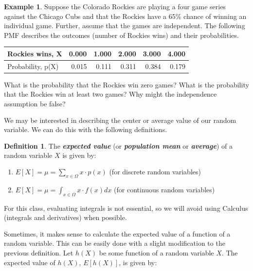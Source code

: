 \documentclass[
  11pt,
]{book}
\theoremstyle{definition}
\newtheorem{definition}{Definition}[chapter]
\theoremstyle{definition}
\newtheorem{example}{Example}[chapter]
\theoremstyle{definition}
\theoremstyle{definition}
\theoremstyle{remark}
\begin{document}
\begin{example}
Suppose the Colorado Rockies are playing a four game series against the Chicago Cubs and that the Rockies have a 65\% chance of winning an individual game. Further, assume that the games are independent. The following PMF describes the outcomes (number of Rockies wins) and their probabilities.

\begin{table}
\centering
\begin{tabular}{l|r|r|r|r|r}
\hline
Rockies wins, X & 0.000 & 1.000 & 2.000 & 3.000 & 4.000\\
\hline
Probability, p(X) & 0.015 & 0.111 & 0.311 & 0.384 & 0.179\\
\hline
\end{tabular}
\end{table}

What is the probability that the Rockies win zero games? What is the probability that the Rockies win at least two games? Why might the independence assumption be false?
\end{example}

\hfill\break
\hfill\break
\hfill\break
\hfill\break
\hfill\break

We may be interested in describing the center or average value of our random variable. We can do this with the following definitions.

\begin{definition}

The \textbf{\emph{expected value}} (or \textbf{\emph{population mean}} or \textbf{\emph{average}}) of a random variable \(X\) is given by:\\

\begin{enumerate}
\def\labelenumi{(\roman{enumi})}
\item
  \(E[X] = \mu = \sum_{x \in \Omega} x \cdot p(x)\) (for discrete random variables)
\item
  \(E[X] = \mu = \int_{x \in \Omega} x \cdot f(x) dx\) (for continuous random variables)
\end{enumerate}

\end{definition}

For this class, evaluating integrals is not essential, so we will avoid using Calculus (integrals and derivatives) when possible.

Sometimes, it makes sense to calculate the expected value of a function of a random variable. This can be easily done with a slight modification to the previous definition. Let \(h(X)\) be some function of a random variable \(X\). The expected value of \(h(X)\), \(E[h(X)]\), is given by:
\end{document}
